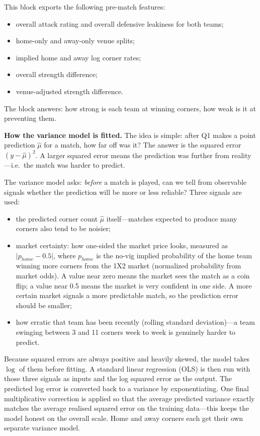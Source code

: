 \documentclass{article}
\begin{document}
This block exports the following pre-match features:
\begin{itemize}
    \item overall attack rating and overall defensive leakiness for both teams;
    \item home-only and away-only venue splits;
    \item implied home and away log corner rates;
    \item overall strength difference;
    \item venue-adjusted strength difference.
\end{itemize}
The block answers: how strong is each team at winning corners, how weak is it at preventing them.

\bigskip

\noindent \textbf{How the variance model is fitted.}
The idea is simple: after Q1 makes a point prediction \(\hat{\mu}\) for a match, how far off was it?
The answer is the squared error \((y - \hat{\mu})^{2}\).
A larger squared error means the prediction was further from reality---i.e.\ the match was harder to predict.

The variance model asks: \emph{before} a match is played, can we tell from observable signals whether the prediction will be more or less reliable?
Three signals are used:
\begin{itemize}
  \item the predicted corner count \(\hat{\mu}\) itself---matches expected to produce many corners also tend to be noisier;
  \item market certainty: how one-sided the market price looks, measured as \(\lvert p_{home} - 0.5 \rvert\), where \(p_{home}\) is the no-vig implied probability of the home team winning more corners from the 1X2 market (normalized probability from market odds). A value near zero means the market sees the match as a coin flip; a value near 0.5 means the market is very confident in one side. A more certain market signals a more predictable match, so the prediction error should be smaller;
  \item how erratic that team has been recently (rolling standard deviation)---a team swinging between 3 and 11 corners week to week is genuinely harder to predict.
\end{itemize}

Because squared errors are always positive and heavily skewed, the model takes \(\log\) of them before fitting.
A standard linear regression (OLS) is then run with those three signals as inputs and the log squared error as the output.
The predicted log error is converted back to a variance by exponentiating.
One final multiplicative correction is applied so that the average predicted variance exactly matches the average realised squared error on the training data---this keeps the model honest on the overall scale.
Home and away corners each get their own separate variance model.
\end{document}
